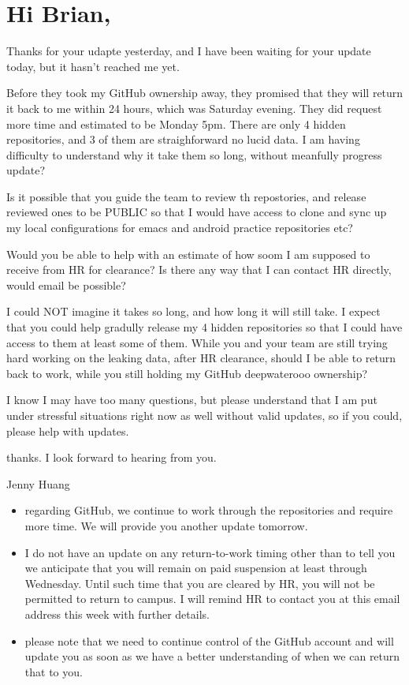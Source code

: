 \documentclass[9pt, b5paaper]{book}
\begin{document}
\chapter{Hi Brian,}
\label{sec-7}

Thanks for your udapte yesterday, and I have been waiting for your
update today, but it hasn't reached me yet. 

Before they took my GitHub ownership away, they promised that they
will return it back to me within 24 hours, which was Saturday
evening. They did request more time and estimated to be Monday 5pm. 
There are only 4 hidden repositories, and 3 of them are straighforward
no lucid data. I am having difficulty to understand why it take them
so long, without meanfully progress update?

Is it possible that you guide the team to review th repostories, and
release reviewed ones to be PUBLIC so that I would have access to
clone and sync up my local configurations for emacs and android
practice repositories etc?

Would you be able to help with an estimate of how soom I am supposed
to receive from HR for clearance? Is there any way that I can contact
HR directly, would email be possible?

I could NOT imagine it takes so long, and how long it will still
take. I expect that you could help gradully release my 4 hidden
repositories so that I could have access to them at least some of
them. While you and your team are still trying hard working on the
leaking data, after HR clearance, should I be able to return back to
work, while you still holding my GitHub deepwaterooo ownership?

I know I may have too many questions, but please understand that I am
put under stressful situations right now as well without valid updates, so if you could,
please help with updates. 

thanks. I look forward to hearing from you. 

Jenny Huang 

\begin{itemize}
\item regarding GitHub, we continue to work through the repositories and require more time. We will provide you another update tomorrow.
\item I do not have an update on any return-to-work timing other than to tell you we anticipate that you will remain on paid suspension at least through Wednesday. Until such time that you are cleared by HR, you will not be permitted to return to campus.  I will remind HR to contact you at this email address this week with further details.
\item please note that we need to continue control of the GitHub account and will update you as soon as we have a better understanding of when we can return that to you.
\end{itemize}
\end{document}
